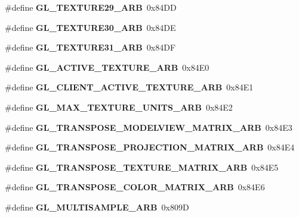 \begin{DoxyCompactItemize}
\item 
\#define {\bfseries G\+L\+\_\+\+T\+E\+X\+T\+U\+R\+E29\+\_\+\+A\+R\+B}~0x84\+D\+D\label{_s_d_l__opengl_8h_a3a192b61218c6778fa93d6972e8f831a}

\item 
\#define {\bfseries G\+L\+\_\+\+T\+E\+X\+T\+U\+R\+E30\+\_\+\+A\+R\+B}~0x84\+D\+E\label{_s_d_l__opengl_8h_ab36202e145b2813b5f19155a21182e44}

\item 
\#define {\bfseries G\+L\+\_\+\+T\+E\+X\+T\+U\+R\+E31\+\_\+\+A\+R\+B}~0x84\+D\+F\label{_s_d_l__opengl_8h_a6c79418aa7cfc73ac32ab90bc32dd780}

\item 
\#define {\bfseries G\+L\+\_\+\+A\+C\+T\+I\+V\+E\+\_\+\+T\+E\+X\+T\+U\+R\+E\+\_\+\+A\+R\+B}~0x84\+E0\label{_s_d_l__opengl_8h_a3d1cdb2bb788ad14678c573385317e57}

\item 
\#define {\bfseries G\+L\+\_\+\+C\+L\+I\+E\+N\+T\+\_\+\+A\+C\+T\+I\+V\+E\+\_\+\+T\+E\+X\+T\+U\+R\+E\+\_\+\+A\+R\+B}~0x84\+E1\label{_s_d_l__opengl_8h_a41f5906c588989322740f2ca87a35c1d}

\item 
\#define {\bfseries G\+L\+\_\+\+M\+A\+X\+\_\+\+T\+E\+X\+T\+U\+R\+E\+\_\+\+U\+N\+I\+T\+S\+\_\+\+A\+R\+B}~0x84\+E2\label{_s_d_l__opengl_8h_a3f8c72ef43026b3f2cd7eec99f1111d7}

\item 
\#define {\bfseries G\+L\+\_\+\+T\+R\+A\+N\+S\+P\+O\+S\+E\+\_\+\+M\+O\+D\+E\+L\+V\+I\+E\+W\+\_\+\+M\+A\+T\+R\+I\+X\+\_\+\+A\+R\+B}~0x84\+E3\label{_s_d_l__opengl_8h_a6a8cd8c67fb15508f34b2e362fd1543b}

\item 
\#define {\bfseries G\+L\+\_\+\+T\+R\+A\+N\+S\+P\+O\+S\+E\+\_\+\+P\+R\+O\+J\+E\+C\+T\+I\+O\+N\+\_\+\+M\+A\+T\+R\+I\+X\+\_\+\+A\+R\+B}~0x84\+E4\label{_s_d_l__opengl_8h_a8d5d470f5d732940570ba7f343c67d40}

\item 
\#define {\bfseries G\+L\+\_\+\+T\+R\+A\+N\+S\+P\+O\+S\+E\+\_\+\+T\+E\+X\+T\+U\+R\+E\+\_\+\+M\+A\+T\+R\+I\+X\+\_\+\+A\+R\+B}~0x84\+E5\label{_s_d_l__opengl_8h_ab5344c3088b6af94b7c72b4e4d302cac}

\item 
\#define {\bfseries G\+L\+\_\+\+T\+R\+A\+N\+S\+P\+O\+S\+E\+\_\+\+C\+O\+L\+O\+R\+\_\+\+M\+A\+T\+R\+I\+X\+\_\+\+A\+R\+B}~0x84\+E6\label{_s_d_l__opengl_8h_aca9c5da6ef5315c5c49345949c1bac6e}

\item 
\#define {\bfseries G\+L\+\_\+\+M\+U\+L\+T\+I\+S\+A\+M\+P\+L\+E\+\_\+\+A\+R\+B}~0x809\+D\label{_s_d_l__opengl_8h_af8a2a4cdd1572339a01b657a3a37d856}


\end{DoxyCompactItemize}
